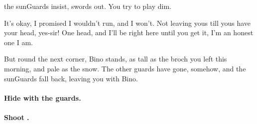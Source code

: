 the \glspl{sunGuard} insist, swords out.
You try to play dim.

\begin{speechtext}
  It's okay, I promised I wouldn't run, and I won't.
  Not leaving yous till yous have your head, yes-sir!
  One head, and I'll be right here until you get it, I'm an honest one I am.
\end{speechtext}

But round the next corner, Bino stands, as tall as the broch you left this morning, and pale as the snow.
The other \glspl{guard} have gone, somehow, and the \glspl{sunGuard} fall back, leaving you with Bino.

\paragraph{Hide with the \glspl{guard}.}

\paragraph{Shoot .}


